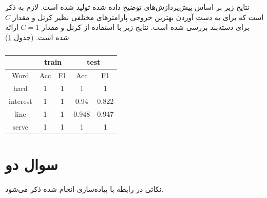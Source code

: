 \documentclass[12pt, a4paper]{article}
\begin{document}
نتایج زیر بر اساس پیش‌پردازش‌های توضیح داده شده تولید شده است. لازم به ذکر است که برای به دست آوردن بهترین
خروجی پارامتر‌های مختلفی نظیر کرنل و مقدار $C$ برای دسته‌بند  بررسی شده است. نتایج زیر با استفاده از
کرنل  و مقدار $C=1$ ارائه شده است. (جدول \ref{svm_without_val})

\clearpage

\begin{latin}
    \begin{table}[h]
        \centering
        \caption{}
        \label{svm_without_val}
        \begin{tabular}{c|c|c|c|c}
            & \multicolumn{2}{c|}{train} & \multicolumn{2}{c}{test} \\
            \hline
            Word & Acc & F1 & Acc & F1 \\
            \hline
            hard     & 1 & 1 & 1 & 1 \\
            interest & 1 & 1 & 0.94 & 0.822 \\
            line     & 1 & 1 & 0.948 & 0.947 \\
            serve    & 1 & 1 & 1 & 1
        \end{tabular}
    \end{table}
\end{latin}

\section*{سوال دو}

نکاتی در رابطه با پیاده‌سازی انجام شده ذکر می‌شود.
\end{document}
